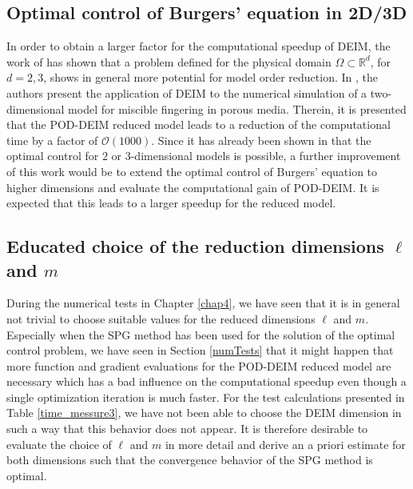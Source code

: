 \subsection*{Optimal control of Burgers' equation in 2D/3D}
In order to obtain a larger factor for the computational speedup of DEIM, the work of \cite{CS10,SN13} has shown that a problem defined for the physical domain $\Omega \subset \mathbb{R}^{d}$, for $d = {2,3}$, shows in general more potential for model order reduction. In \cite{CS10}, the authors present the application of DEIM to the numerical simulation of a two-dimensional model for miscible fingering in porous media. Therein, it is presented that the POD-DEIM reduced model leads to a reduction of the computational time by a factor of $\mathcal{O}(1000)$. Since it has already been shown in \cite{GU12,RT07} that the optimal control for $2$ or $3$-dimensional models is possible, a further improvement of this work would be to extend the optimal control of Burgers' equation to higher dimensions and evaluate the computational gain of POD-DEIM. It is expected that this leads to a larger speedup for the reduced model.
\subsection*{Educated choice of the reduction dimensions $\ell$ and $m$}
During the numerical tests in Chapter \ref{chap4}, we have seen that it is in general not trivial to choose suitable values for the reduced dimensions $\ell$ and $m$. Especially when the SPG method has been used for the solution of the optimal control problem, we have seen in Section \ref{numTests} that it might happen that more function and gradient evaluations for the POD-DEIM reduced model are necessary which has a bad influence on the computational speedup even though a single optimization iteration is much faster. For the test calculations presented in Table \ref{time_messure3}, we have not been able to choose the DEIM dimension in such a way that this behavior does not appear. It is therefore desirable to evaluate the choice of $\ell$ and $m$ in more detail and derive an a priori estimate for both dimensions such that the convergence behavior of the SPG method is optimal.
